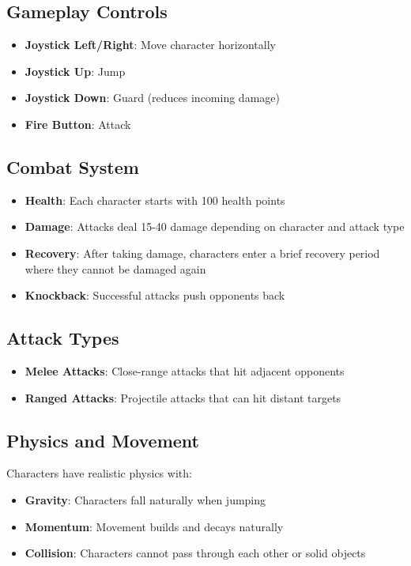 \documentclass[10pt,twocolumn]{article}
\begin{document}
\subsection{Gameplay Controls}
\begin{itemize}
\item \textbf{Joystick Left/Right}: Move character horizontally
\item \textbf{Joystick Up}: Jump
\item \textbf{Joystick Down}: Guard (reduces incoming damage)
\item \textbf{Fire Button}: Attack
\end{itemize}

\subsection{Combat System}
\begin{itemize}
\item \textbf{Health}: Each character starts with 100 health points
\item \textbf{Damage}: Attacks deal 15-40 damage depending on character and attack type
\item \textbf{Recovery}: After taking damage, characters enter a brief recovery period where they cannot be damaged again
\item \textbf{Knockback}: Successful attacks push opponents back
\end{itemize}

\subsection{Attack Types}
\begin{itemize}
\item \textbf{Melee Attacks}: Close-range attacks that hit adjacent opponents
\item \textbf{Ranged Attacks}: Projectile attacks that can hit distant targets
\end{itemize}

\subsection{Physics and Movement}
Characters have realistic physics with:
\begin{itemize}
\item \textbf{Gravity}: Characters fall naturally when jumping
\item \textbf{Momentum}: Movement builds and decays naturally
\item \textbf{Collision}: Characters cannot pass through each other or solid objects
\end{itemize}
\end{document}
